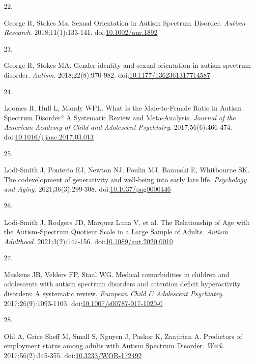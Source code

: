 \documentclass[
  letterpaper,
  DIV=11,
  numbers=noendperiod]{scrreprt}
\newlength{\cslhangindent}
\newlength{\csllabelwidth}
\newenvironment{CSLReferences}[2] %
 {\begin{list}{}{%
  \setlength{\itemindent}{0pt}
  \setlength{\leftmargin}{0pt}
  \setlength{\parsep}{0pt}
  \ifodd #1
   \setlength{\leftmargin}{\cslhangindent}
   \setlength{\itemindent}{-1\cslhangindent}
  \fi
  \setlength{\itemsep}{#2\baselineskip}}}
 {\end{list}}
\newcommand{\CSLLeftMargin}[1]{\parbox[t]{\csllabelwidth}{\strut#1\strut}}
\newcommand{\CSLRightInline}[1]{\parbox[t]{\linewidth - \csllabelwidth}{\strut#1\strut}}
\begin{document}
\begin{CSLReferences}{0}{1}
\CSLLeftMargin{22. }%
\CSLRightInline{George R, Stokes Ma. Sexual {Orientation} in {Autism
Spectrum Disorder}. \emph{Autism Research}. 2018;11(1):133-141.
doi:\href{https://doi.org/10.1002/aur.1892}{10.1002/aur.1892}}

\CSLLeftMargin{23. }%
\CSLRightInline{George R, Stokes MA. Gender identity and sexual
orientation in autism spectrum disorder. \emph{Autism}.
2018;22(8):970-982.
doi:\href{https://doi.org/10.1177/1362361317714587}{10.1177/1362361317714587}}

\CSLLeftMargin{24. }%
\CSLRightInline{Loomes R, Hull L, Mandy WPL. What {Is} the
{Male-to-Female Ratio} in {Autism Spectrum Disorder}? {A Systematic
Review} and {Meta-Analysis}. \emph{Journal of the American Academy of
Child and Adolescent Psychiatry}. 2017;56(6):466-474.
doi:\href{https://doi.org/10.1016/j.jaac.2017.03.013}{10.1016/j.jaac.2017.03.013}}

\CSLLeftMargin{25. }%
\CSLRightInline{Lodi-Smith J, Ponterio EJ, Newton NJ, Poulin MJ,
Baranski E, Whitbourne SK. The codevelopment of generativity and
well-being into early late life. \emph{Psychology and Aging}.
2021;36(3):299-308.
doi:\href{https://doi.org/10.1037/pag0000446}{10.1037/pag0000446}}

\CSLLeftMargin{26. }%
\CSLRightInline{Lodi-Smith J, Rodgers JD, Marquez Luna V, et al. The
{Relationship} of {Age} with the {Autism-Spectrum Quotient Scale} in a
{Large Sample} of {Adults}. \emph{Autism Adulthood}. 2021;3(2):147-156.
doi:\href{https://doi.org/10.1089/aut.2020.0010}{10.1089/aut.2020.0010}}

\CSLLeftMargin{27. }%
\CSLRightInline{Muskens JB, Velders FP, Staal WG. Medical comorbidities
in children and adolescents with autism spectrum disorders and attention
deficit hyperactivity disorders: A systematic review. \emph{European
Child \& Adolescent Psychiatry}. 2017;26(9):1093-1103.
doi:\href{https://doi.org/10.1007/s00787-017-1020-0}{10.1007/s00787-017-1020-0}}

\CSLLeftMargin{28. }%
\CSLRightInline{Ohl A, Grice Sheff M, Small S, Nguyen J, Paskor K,
Zanjirian A. Predictors of employment status among adults with {Autism
Spectrum Disorder}. \emph{Work}. 2017;56(2):345-355.
doi:\href{https://doi.org/10.3233/WOR-172492}{10.3233/WOR-172492}}


\end{CSLReferences}
\end{document}

